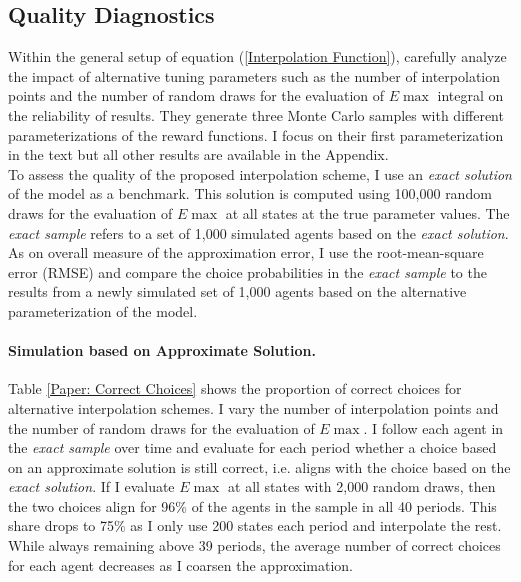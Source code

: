 \subsection{Quality Diagnostics}
Within the general setup of equation (\ref{Interpolation Function}), \citet{Keane.1994} carefully analyze the impact of alternative tuning parameters such as the number of interpolation points and the number of random draws for the evaluation of $E\max$ integral on the reliability of results. They generate three Monte Carlo samples with different parameterizations of the reward functions. I focus on their first parameterization in the text but all other results are available in the Appendix.\\\newline
%
To assess the quality of the proposed interpolation scheme, I use an \textit{exact solution} of the model as a benchmark. This solution is computed using 100,000 random draws for the evaluation of $E\max$ at all states at the true parameter values. The \textit{exact sample} refers to a set of 1,000 simulated agents based on the \textit{exact solution}. As on overall measure of the approximation error, I use the root-mean-square error (RMSE) and compare the choice probabilities in the \textit{exact sample} to the results from a newly simulated set of 1,000 agents based on the alternative parameterization of the model.
\paragraph{Simulation based on Approximate Solution.}
Table \ref{Paper: Correct Choices} shows the proportion of correct choices for alternative interpolation schemes. I vary the number of interpolation points and the number of random draws for the evaluation of $E\max$. I follow each agent in the \textit{exact sample} over time and evaluate for each period whether a choice based on an approximate solution is still correct, i.e. aligns with the choice based on the \textit{exact solution}. If I evaluate $E\max$ at all states with 2,000 random draws, then the two choices align for 96\% of the agents in the sample in all 40 periods. This share drops to 75\% as I only use 200 states each period and interpolate the rest. While always remaining above 39 periods, the average number of correct choices for each agent decreases as I coarsen the approximation.

